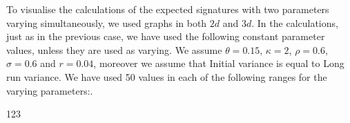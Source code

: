 \documentclass[12pt,a4paper]{report}
\theoremstyle{definition}
\begin{document}
To visualise the calculations of the expected signatures with two parameters varying simultaneously, we used graphs in both $2d$ and $3d$. In the calculations, just as in the previous case, we have used the following constant parameter values, unless they are used as varying. We assume $\theta=0.15$, $\kappa=2$, $\rho=0.6$, $\sigma=0.6$ and $r=0.04$, moreover we assume that Initial variance is equal to Long run variance. We have used 50 values in each of the following ranges for the varying parameters:.



123
\end{document}
